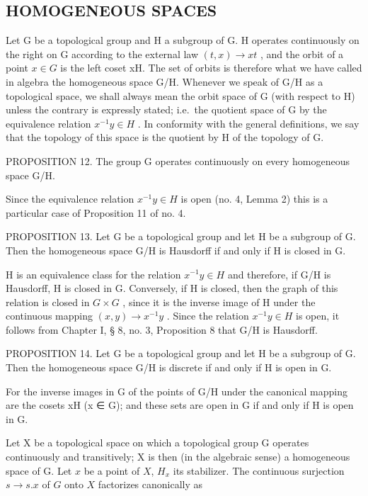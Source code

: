 \subsection{HOMOGENEOUS SPACES}

Let G be a topological group and H a subgroup of G. H operates continuously on the right on G according to the external law \((t, x) \to xt\) , and the orbit of a point \(x \in G\) is the left coset xH. The set of orbits is therefore what we have called in algebra the homogeneous space G/H. Whenever we speak of G/H as a topological space, we shall always mean the orbit space of G (with respect to H) unless the contrary is expressly stated; i.e.~the quotient space of G by the equivalence relation \(x^{-1}y \in H\) . In conformity with the general definitions, we say that the topology of this space is the quotient by H of the topology of G.

PROPOSITION 12. The group G operates continuously on every homogeneous space G/H.

Since the equivalence relation \(x^{-1}y \in H\) is open (no. 4, Lemma 2) this is a particular case of Proposition 11 of no. 4.

PROPOSITION 13. Let G be a topological group and let H be a subgroup of G. Then the homogeneous space G/H is Hausdorff if and only if H is closed in G.

H is an equivalence class for the relation \(x^{-1}y \in H\) and therefore, if G/H is Hausdorff, H is closed in G. Conversely, if H is closed, then the graph of this relation is closed in \(G \times G\) , since it is the inverse image of H under the continuous mapping \((x, y) \to x^{-1}y\) . Since the relation \(x^{-1}y \in H\) is open, it follows from Chapter I, § 8, no. 3, Proposition 8 that G/H is Hausdorff.

PROPOSITION 14. Let G be a topological group and let H be a subgroup of G. Then the homogeneous space G/H is discrete if and only if H is open in G.

For the inverse images in G of the points of G/H under the canonical mapping are the cosets xH (x ∈ G); and these sets are open in G if and only if H is open in G.

Let X be a topological space on which a topological group G operates continuously and transitively; X is then (in the algebraic sense) a homogeneous space of G. Let \(x\) be a point of \(X\), \(H_x\) its stabilizer. The continuous surjection \(s \to s.x\) of \(G\) onto \(X\) factorizes canonically as

